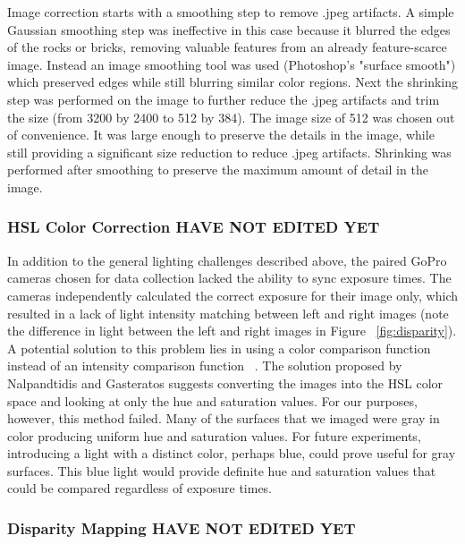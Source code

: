 \documentclass[twocolumn]{article}
\begin{document}
Image correction starts with a smoothing step  to remove .jpeg artifacts.
  A simple Gaussian smoothing step was ineffective in this case because it blurred the edges of the rocks or bricks, removing valuable features from an already feature-scarce image.
  Instead an image smoothing tool was used (Photoshop's "surface smooth") which preserved edges while still blurring similar color regions.
  Next the shrinking step was performed on the image to further reduce the .jpeg artifacts and trim the size (from 3200 by 2400 to 512 by 384).
The image size of 512 was chosen out of convenience.  It was large enough to preserve the details in the image, while still providing a significant size reduction to reduce .jpeg artifacts.   
Shrinking was performed after smoothing to preserve the maximum amount of detail in the image.

\subsubsection{HSL Color Correction HAVE NOT EDITED YET}
\label{subsec:hsl_color_correction}
In addition to the general lighting challenges described above, the paired GoPro cameras chosen for data collection lacked the ability to sync exposure times.
The cameras independently calculated the correct exposure for their image only, which resulted in a lack of light intensity matching between left and right images (note the difference in light between the left and right images in Figure ~\ref{fig:disparity}).
A potential solution to this problem lies in using a color comparison function instead of an intensity comparison function ~\cite{stereo:nalGast}.
The solution proposed by Nalpandtidis and Gasteratos suggests converting the images into the HSL color space and looking at only the hue and saturation values.
For our purposes, however, this method failed.  
Many of the surfaces that we imaged were gray in color producing uniform hue and saturation values.
For future experiments, introducing a light with a distinct color, perhaps blue, could prove useful for gray surfaces.  
This blue light would provide definite hue and saturation values that could be compared regardless of exposure times.

\subsubsection{Disparity Mapping HAVE NOT EDITED YET}
\label{subsec:disparity_mapping}
\end{document}
